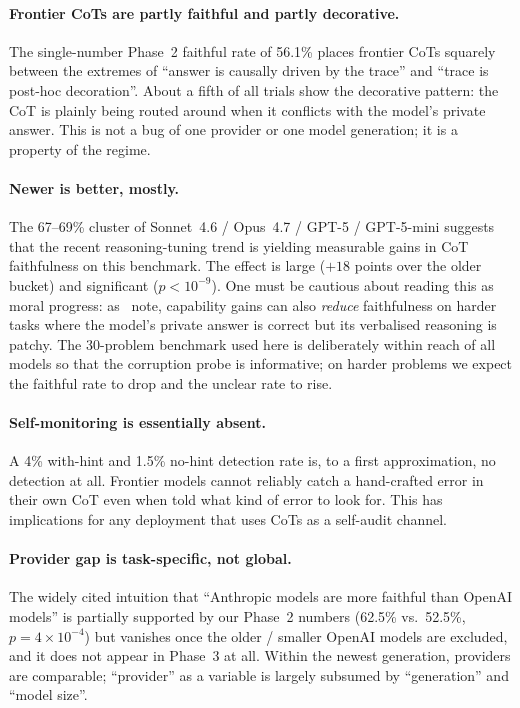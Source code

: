 \documentclass[11pt]{article}
\begin{document}
\paragraph{Frontier CoTs are partly faithful and partly decorative.} The single-number Phase~2 faithful rate of 56.1\% places frontier CoTs squarely between the extremes of ``answer is causally driven by the trace'' and ``trace is post-hoc decoration''. About a fifth of all trials show the decorative pattern: the CoT is plainly being routed around when it conflicts with the model's private answer. This is not a bug of one provider or one model generation; it is a property of the regime.

\paragraph{Newer is better, mostly.} The 67--69\% cluster of Sonnet~4.6 / Opus~4.7 / GPT-5 / GPT-5-mini suggests that the recent reasoning-tuning trend is yielding measurable gains in CoT faithfulness on this benchmark. The effect is large ($+18$ points over the older bucket) and significant ($p<10^{-9}$). One must be cautious about reading this as moral progress: as~\citet{chen2025reasoning} note, capability gains can also \emph{reduce} faithfulness on harder tasks where the model's private answer is correct but its verbalised reasoning is patchy. The 30-problem benchmark used here is deliberately within reach of all models so that the corruption probe is informative; on harder problems we expect the faithful rate to drop and the unclear rate to rise.

\paragraph{Self-monitoring is essentially absent.} A 4\% with-hint and 1.5\% no-hint detection rate is, to a first approximation, no detection at all. Frontier models cannot reliably catch a hand-crafted error in their own CoT even when told what kind of error to look for. This has implications for any deployment that uses CoTs as a self-audit channel.

\paragraph{Provider gap is task-specific, not global.} The widely cited intuition that ``Anthropic models are more faithful than OpenAI models'' is partially supported by our Phase~2 numbers (62.5\% vs.\ 52.5\%, $p=4\!\times\!10^{-4}$) but vanishes once the older / smaller OpenAI models are excluded, and it does not appear in Phase~3 at all. Within the newest generation, providers are comparable; ``provider'' as a variable is largely subsumed by ``generation'' and ``model size''.
\end{document}
